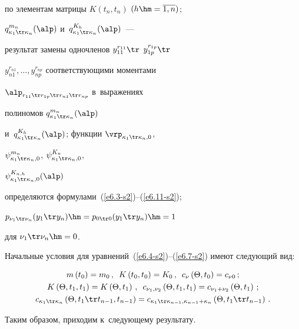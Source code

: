 по элементам матрицы $K(t_n, t_n)$ $(h\hm=\overline{1,n})$; 

$q_{\kappa_1\tr \kappa_n}^{m_n} (\alp)$ и~$q_{\kappa_1\tr \kappa_n}^{K_h} (\alp)$~--- 

результат замены одночленов $y_{11}^{r_{11}} \tr$ $y_{1p}^{r_{1p}} \tr$ 

$y_{n1}^{r_{n1}},\ldots, y_{np}^{r_{np}}$ соответствующими моментами 

$\alp_{r_{11} \tr r_{1p}\tr r_{n1}\tr r_{np}}$ в~выражениях 

полиномов $q_{\kappa_1\tr \kappa_n}^{m_n} (\alp)$ 

и~$q_{\kappa_1\tr \kappa_n}^{K_h} (\alp)$; функции $\vrp_{\kappa_1\tr \kappa_n, 0}$, 

$\psi_{\kappa_1\tr \kappa_n,0}^{m_n}$, $\psi_{\kappa_1\tr \kappa_n,0}^{K_n}$, 

$\psi_{\kappa_1\tr \kappa_n,0}^{K_{n,h}} (\alp)$ 

определяются формулами~(\ref{e6.3-s2})--(\ref{e6.11-s2}); 

$p_{\nu_1\tr \nu_n} (y_1\tr y_n)\hm = p_{0\tr 0} (y_1\tr y_n)\hm =1$ 

для $\nu_1 \tr \nu_n\hm=0$.



Начальные условия для уравнений~(\ref{e6.4-s2})--(\ref{e6.7-s2}) имеют следующий вид:

\begin{gather}

m\left(t_0\right) = m_0\,, \enskip K\left(t_0, t_0\right) = K_0\,, \enskip 

c_\nu \left(\Theta, t_0\right) = c_{\nu 0}\,;\label{e6.12-s2}\\

K\left(\Theta, t_1, t_1\right) = K\left(\Theta, t_1\right)\,,\enskip 

c_{\nu_1,\nu_2}\left(\Theta, t_1, t_1\right) = 

c_{\nu_1 +\nu_2} \left(\Theta, t_1\right)\,;\label{e6.13-s2}\\

c_{\kappa_1\tr \kappa_n} \left(\Theta, t_1\tr t_{n-1}, t_{n-1}\right) = 

c_{\kappa_1\tr \kappa_{n-1},\kappa_{n-1} + \kappa_n} 

\left(\Theta, t_1\tr t_{n-1}\right)\,.\label{e6.14-s2}

\end{gather}



Таким образом, приходим к~следующему результату.



